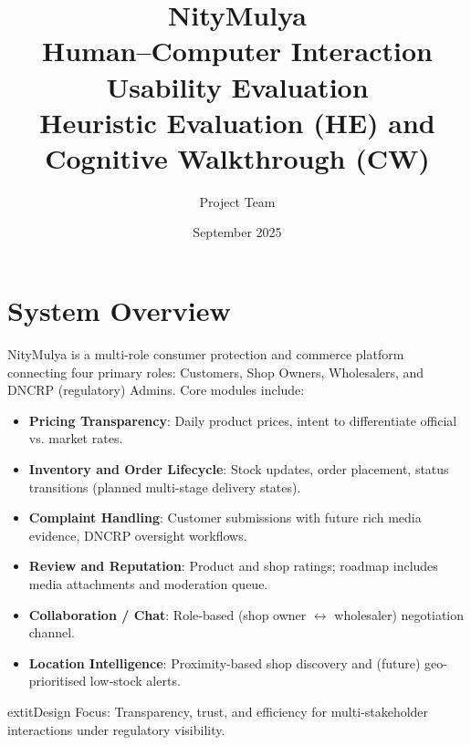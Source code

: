 \documentclass[11pt,a4paper]{article}
\title{NityMulya\\Human--Computer Interaction Usability Evaluation\\\large Heuristic Evaluation (HE) and Cognitive Walkthrough (CW)}
\author{Project Team}
\date{September 2025}
\begin{document}
\maketitle
\tableofcontents
\newpage

\section{System Overview}
NityMulya is a multi-role consumer protection and commerce platform connecting four primary roles: Customers, Shop Owners, Wholesalers, and DNCRP (regulatory) Admins. Core modules include:
\begin{itemize}
	\item \textbf{Pricing Transparency}: Daily product prices, intent to differentiate official vs. market rates.
	\item \textbf{Inventory and Order Lifecycle}: Stock updates, order placement, status transitions (planned multi-stage delivery states).
	\item \textbf{Complaint Handling}: Customer submissions with future rich media evidence, DNCRP oversight workflows.
	\item \textbf{Review and Reputation}: Product and shop ratings; roadmap includes media attachments and moderation queue.
	\item \textbf{Collaboration / Chat}: Role‑based (shop owner \(\leftrightarrow\) wholesaler) negotiation channel.
	\item \textbf{Location Intelligence}: Proximity-based shop discovery and (future) geo-prioritised low‑stock alerts.
\end{itemize}
	extit{Design Focus:} Transparency, trust, and efficiency for multi‑stakeholder interactions under regulatory visibility.
\end{document}
